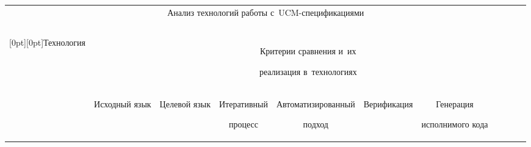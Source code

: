 \begin{table}\small

\begin{center}



\tabcolsep=4pt

\begin{tabular}{|l|c|c|c|c|c|c|c|c|c|c|}

\multicolumn{11}{c}{Анализ технологий работы с~UCM-спецификациями}\\

\multicolumn{11}{c}{\ }\\[-6pt]

\hline %

\multicolumn{1}{|c|}{\raisebox{-54pt}[0pt][0pt]{Технология}} &\multicolumn{10}{c|}{Критерии сравнения и~их

реализация в~технологиях}\\

\cline{2-11}

&\begin{turn}{90}\hspace*{10pt}Исходный язык\end{turn}&

\begin{turn}{90}\hspace*{16pt}Целевой язык\end{turn} &

\begin{turn}{90}\hspace*{16pt}Итеративный\end{turn} \begin{turn}{90} \hspace*{28pt}процесс\end{turn} &

\begin{turn}{90}Автоматизированный\hspace*{2pt}\end{turn} \begin{turn}{90}\hspace*{28pt}подход\end{turn}

&

\begin{turn}{90}\hspace*{16pt}Верификация\end{turn}&

\begin{turn}{90}\hspace*{24pt}Генерация\end{turn} \begin{turn}{90}\hspace*{6pt}исполнимого кода\end{turn}&


\end{tabular}
\end{center}
\end{table}
